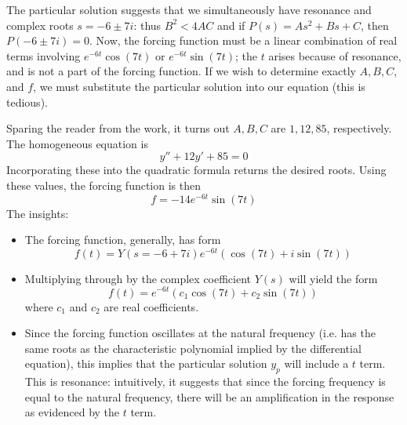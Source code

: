 \documentclass[a4paper]{article}
\begin{document}
The particular solution suggests that we simultaneously have resonance and complex roots \( s = -6 \pm 7i \): thus \( B^{2} < 4AC \) and if \( P \!\left( s  \right) = As^{2} + Bs + C  \), then \( P \!\left( -6 \pm 7i  \right) = 0 \). Now, the forcing function must be a linear combination of real terms involving \( e^{-6t } \cos\!\left( 7t \right)  \) or \( e^{-6t} \sin\!\left( 7t \right)  \); the \( t  \) arises because of resonance, and is not a part of the forcing function. If we wish to determine exactly \( A, B, C  \), and \( f  \), we must substitute the particular solution into our equation (this is tedious).

Sparing the reader from the work, it turns out \( A, B, C  \) are \( 1, 12, 85 \), respectively. The homogeneous equation is
\[
	 y'' + 12y' + 85 = 0
\]
Incorporating these into the quadratic formula returns the desired roots. Using these values, the forcing function is then
\[
	f = -14e^{-6t } \sin\!\left( 7t \right) 
\]
The insights:
\begin{itemize}[label=\(\circ\)]
	\item The forcing function, generally, has form 
	\[ 
		f \!\left( t  \right) = Y \!\left( s = -6 + 7i \right) e^{-6t} \!\left( \cos\!\left( 7t \right) + i \sin\!\left( 7t \right) \right) 
	\]
	\item Multiplying through by the complex coefficient \( Y \!\left( s  \right) \) will yield the form
	\[
		f \!\left( t  \right) = e^{-6t } \!\left( c_{1} \cos\!\left( 7t \right) + c_{2} \sin\!\left( 7t \right)  \right) 
	\]
	where \( c_{1} \) and \( c_{2} \) are real coefficients.
	\item Since the forcing function oscillates at the natural frequency (i.e. has the same roots as the characteristic polynomial implied by the differential equation), this implies that the particular solution \( y_{p } \) will include a \( t  \) term. This is resonance: intuitively, it suggests that since the forcing frequency is equal to the natural frequency, there will be an amplification in the response as evidenced by the \( t  \) term.
\end{itemize}

\end{document}

